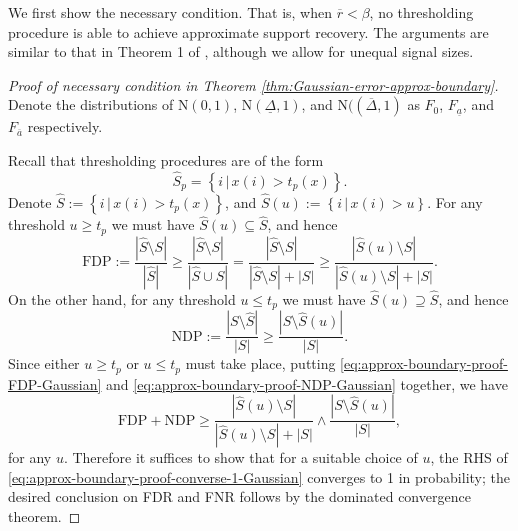 We first show the necessary condition. 
That is, when $\overline{r} < \beta$, no thresholding procedure is able to achieve approximate support recovery.
The arguments are similar to that in Theorem 1 of \cite{arias2017distribution}, although we allow for unequal signal sizes. 

\begin{proof}[Proof of necessary condition in Theorem \ref{thm:Gaussian-error-approx-boundary}]
Denote the distributions of $\mathrm{N}(0,1)$, $\mathrm{N}(\underline{\Delta}, 1)$, and $\mathrm{N}((\overline{\Delta}, 1)$ as $F_0$, $F_{\underline{a}}$, and $F_{\overline{a}}$ respectively.


Recall that thresholding procedures are of the form
$$
\widehat{S}_p = \left\{i\,|\,x(i) > t_p(x)\right\}.
$$
Denote $\widehat{S} := \left\{i\,|\,x(i) > t_p(x)\right\}$, and $\widehat{S}(u) := \left\{i\,|\,x(i) > u\right\}$.
For any threshold $u\ge t_p$ we must have $\widehat{S}(u)\subseteq\widehat{S}$, and hence
\begin{equation} \label{eq:approx-boundary-proof-FDP-Gaussian}
    \text{FDP} := \frac{|\widehat{S}\setminus{S}|}{|\widehat{S}|} \ge \frac{|\widehat{S}\setminus{S}|}{|\widehat{S}\cup{S}|} = \frac{|\widehat{S}\setminus{S}|}{|\widehat{S}\setminus{S}| + |S|} \ge
    \frac{|\widehat{S}(u)\setminus{S}|}{|\widehat{S}(u)\setminus{S}| + |S|}.
\end{equation}
On the other hand, for any threshold $u\le t_p$ we must have $\widehat{S}(u)\supseteq\widehat{S}$, and hence
\begin{equation} \label{eq:approx-boundary-proof-NDP-Gaussian}
    \text{NDP} := \frac{|{S}\setminus\widehat{S}|}{|{S}|} \ge 
    \frac{|{S}\setminus\widehat{S}(u)|}{|{S}|}.
\end{equation}
Since either $u\ge t_p$ or  $u\le t_p$ must take place, putting \eqref{eq:approx-boundary-proof-FDP-Gaussian} and \eqref{eq:approx-boundary-proof-NDP-Gaussian} together, we have
\begin{equation} \label{eq:approx-boundary-proof-converse-1-Gaussian}
    \text{FDP} + \text{NDP} 
    \ge \frac{|\widehat{S}(u)\setminus{S}|}{|\widehat{S}(u)\setminus{S}|+|{S}|} \wedge \frac{|{S}\setminus\widehat{S}(u)|}{|{S}|},
\end{equation}
for any $u$.
Therefore it suffices to show that for a suitable choice of $u$, the RHS of \eqref{eq:approx-boundary-proof-converse-1-Gaussian} converges to 1 in probability; the desired conclusion on FDR and FNR follows by the dominated convergence theorem.


\end{proof}
